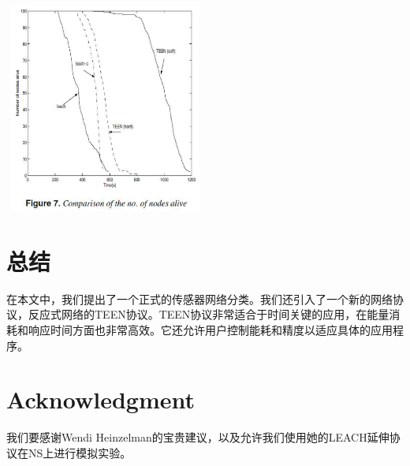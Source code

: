 \documentclass[journal]{IEEEtran}
\begin{document}
\begin{CJK}{UTF8}{gbsn}
\noindent
\includegraphics[height=260, width=250]{7.eps}

\section{\textbf{总结}}

在本文中，我们提出了一个正式的传感器网络分类。我们还引入了一个新的网络协议，反应式网络的TEEN协议。TEEN协议非常适合于时间关键的应用，在能量消耗和响应时间方面也非常高效。它还允许用户控制能耗和精度以适应具体的应用程序。

\section*{Acknowledgment}

我们要感谢Wendi Heinzelman的宝贵建议，以及允许我们使用她的LEACH延伸协议在NS上进行模拟实验。

\ifCLASSOPTIONcaptionsoff
  \newpage
\fi





\end{CJK}
\end{document}
